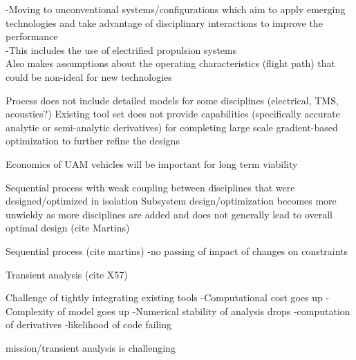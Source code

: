 -Moving to unconventional systems/configurations which aim to apply emerging technologies and take advantage of disciplinary interactions to improve the performance\\
-This includes the use of electrified propulsion systems\\

Also makes assumptions about the operating characteristics (flight path) that could be non-ideal for new technologies

Process does not include detailed models for some disciplines (electrical, TMS, acoustics?)
Existing tool set does not provide capabilities (specifically accurate analytic or semi-analytic derivatives) for completing large scale gradient-based optimization to further refine the designs

Economics of UAM vehicles will be important for long term viability






Sequential process with weak coupling between disciplines that were designed/optimized in isolation
Subsystem design/optimization becomes more unwieldy as more disciplines are added and does not generally lead to overall optimal design (cite Martins)


Sequential process (cite martins)
-no passing of impact of changes on constraints

Transient analysis (cite X57)


Challenge of tightly integrating existing tools
-Computational cost goes up
-Complexity of model goes up
-Numerical stability of analysis drops
    -computation of derivatives
    -likelihood of code failing

mission/transient analysis is challenging




